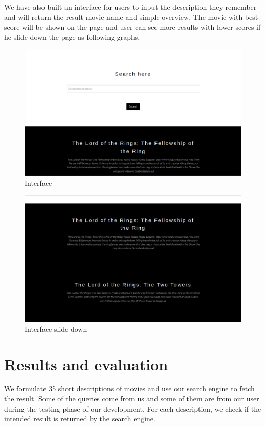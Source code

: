\documentclass[sigconf,nonacm]{acmart}
\begin{document}
We have also built an interface for users to input the description they remember and will return the result movie name and simple overview. The movie with best score will be shown on the page and user can see more results with lower scores if he slide down the page as following graphs,


\begin{figure}[H]
  \centering
  \includegraphics[width=0.8\linewidth]{interface.jpg}
  \caption{Interface}
\end{figure}

\begin{figure}[H]
  \centering
  \includegraphics[width=0.8\linewidth]{interface1.jpg}
  \caption{Interface slide down}
\end{figure}

\section{Results and evaluation}

We formulate 35 short descriptions of movies and use our search engine to
fetch the result.
Some of the queries come from us and some of them are from our user during
the testing phase of our development.
For each description, we check if the intended result is returned by the
search engine.
\end{document}

